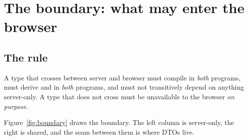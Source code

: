 \chapter{The boundary: what may enter the browser}
\label{ch:boundary}

\section{The rule}

\begin{keyidea}
A type that crosses between server and browser must compile in \emph{both} programs, must derive
 and  in \emph{both} programs, and must not transitively depend
on anything server-only. A type that does not cross must be unavailable to the browser
\emph{on purpose}.
\end{keyidea}

Figure~\ref{fig:boundary} draws the boundary. The left column is server-only, the right is shared,
and the seam between them is where DTOs live.

